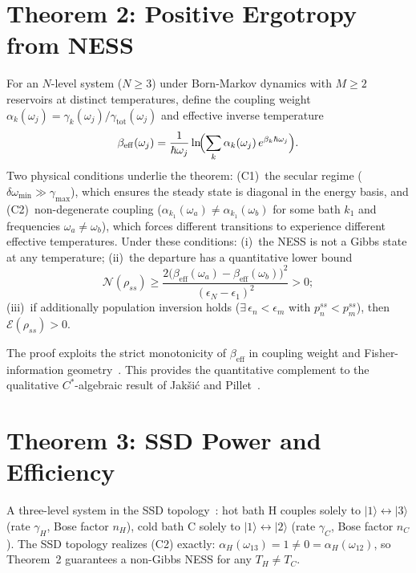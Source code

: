 \documentclass[prl,twocolumn,superscriptaddress,amsmath,amssymb]{revtex4-2}
\begin{document}
\section{Theorem 2: Positive Ergotropy from NESS}

For an $N$-level system ($N \geq 3$) under Born-Markov dynamics with $M \geq 2$ reservoirs at distinct temperatures, define the coupling weight $\alpha_k(\omega_j) = \gamma_k(\omega_j)/\gamma_{\mathrm{tot}}(\omega_j)$ and effective inverse temperature
\begin{equation}\label{eq:betaeff}
\beta_{\mathrm{eff}}(\omega_j) = \frac{1}{\hbar\omega_j}\ln\!\Bigl(\sum_k \alpha_k(\omega_j)\,e^{\beta_k\hbar\omega_j}\Bigr).
\end{equation}
Two physical conditions underlie the theorem: (C1)~the secular regime ($\delta\omega_{\min} \gg \gamma_{\max}$), which ensures the steady state is diagonal in the energy basis, and (C2)~non-degenerate coupling ($\alpha_{k_1}(\omega_a) \neq \alpha_{k_1}(\omega_b)$ for some bath $k_1$ and frequencies $\omega_a \neq \omega_b$), which forces different transitions to experience different effective temperatures. Under these conditions: (i)~the NESS is not a Gibbs state at any temperature; (ii)~the departure has a quantitative lower bound
\begin{equation}\label{eq:bound}
\mathcal{N}(\rho_{ss}) \geq \frac{2\bigl(\beta_{\mathrm{eff}}(\omega_a) - \beta_{\mathrm{eff}}(\omega_b)\bigr)^2}{(\epsilon_N - \epsilon_1)^2} > 0;
\end{equation}
(iii)~if additionally population inversion holds ($\exists\, \epsilon_n < \epsilon_m$ with $p_n^{ss} < p_m^{ss}$), then $\mathcal{E}(\rho_{ss}) > 0$.

The proof exploits the strict monotonicity of $\beta_{\mathrm{eff}}$ in coupling weight and Fisher-information geometry~\cite{SM}. This provides the quantitative complement to the qualitative $C^*$-algebraic result of Jak\v{s}i\'{c} and Pillet~\cite{Jaksic2002}.

\section{Theorem 3: SSD Power and Efficiency}

A three-level system in the SSD topology~\cite{SSD1959}: hot bath H couples solely to $|1\rangle\!\leftrightarrow\!|3\rangle$ (rate $\gamma_H$, Bose factor $n_H$), cold bath C solely to $|1\rangle\!\leftrightarrow\!|2\rangle$ (rate $\gamma_C$, Bose factor $n_C$). The SSD topology realizes (C2) exactly: $\alpha_H(\omega_{13}) = 1 \neq 0 = \alpha_H(\omega_{12})$, so Theorem~2 guarantees a non-Gibbs NESS for any $T_H \neq T_C$.
\end{document}
